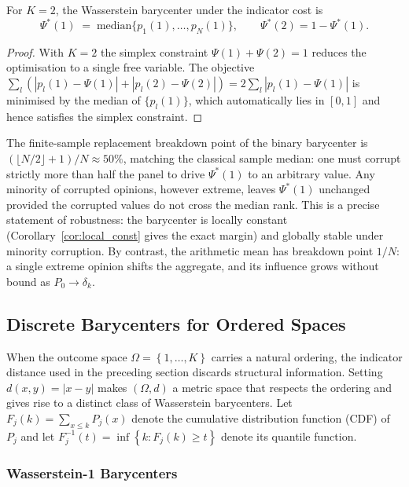 \begin{corollary}
\label{cor:binary}
For $K=2$, the Wasserstein barycenter under the indicator cost is
\[
  \Psi^*(1) \;=\; \mathrm{median}\{p_1(1),\ldots,p_N(1)\}, \qquad \Psi^*(2) = 1 - \Psi^*(1).
\]
\end{corollary}
\begin{proof}
With $K=2$ the simplex constraint $\Psi(1)+\Psi(2)=1$ reduces the optimisation to a single free variable.  The objective $\sum_l(|p_l(1)-\Psi(1)|+|p_l(2)-\Psi(2)|) = 2\sum_l|p_l(1)-\Psi(1)|$ is minimised by the median of $\{p_l(1)\}$, which automatically lies in $[0,1]$ and hence satisfies the simplex constraint.
\end{proof}
\begin{remark}
The finite-sample replacement breakdown point of the binary barycenter is $(\lfloor N/2\rfloor + 1)/N \approx 50\%$, matching the classical sample median: one must corrupt strictly more than half the panel to drive $\Psi^*(1)$ to an arbitrary value.  Any minority of corrupted opinions, however extreme, leaves $\Psi^*(1)$ unchanged provided the corrupted values do not cross the median rank.  This is a precise statement of robustness: the barycenter is locally constant (Corollary~\ref{cor:local_const} gives the exact margin) and globally stable under minority corruption.  By contrast, the arithmetic mean has breakdown point $1/N$: a single extreme opinion shifts the aggregate, and its influence grows without bound as $P_0 \to \delta_k$.
\end{remark}

\subsection{Discrete Barycenters for Ordered Spaces}

When the outcome space $\Omega = \left\{1,\ldots,K\right\}$ carries a natural ordering, the indicator distance used in the preceding section discards structural information.  Setting $d(x,y)=|x-y|$ makes $(\Omega,d)$ a metric space that respects the ordering and gives rise to a distinct class of Wasserstein barycenters.  Let $F_j(k)=\sum_{x\leq k}P_j(x)$ denote the cumulative distribution function (CDF) of $P_j$ and let $F_j^{-1}(t)=\inf\left\{k:F_j(k)\geq t\right\}$ denote its quantile function.

\subsubsection*{Wasserstein-1 Barycenters}

